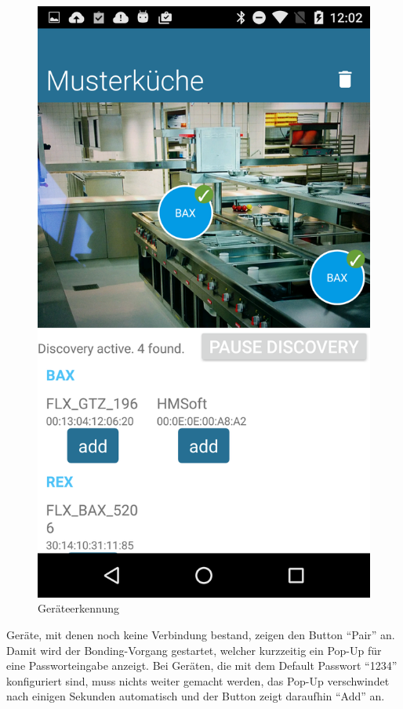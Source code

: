 \begin{figure}
	\vspace{-0.44cm}
	\includegraphics[scale=0.13]{results/res/device_discovery}
	\caption{Geräteerkennung}
\end{figure}

Geräte, mit denen noch keine Verbindung bestand, zeigen den Button \enquote{Pair} an. Damit wird der Bonding-Vorgang gestartet, welcher kurzzeitig ein Pop-Up für eine Passworteingabe anzeigt. Bei Geräten, die mit dem Default Passwort \enquote{1234} konfiguriert sind, muss nichts weiter gemacht werden, das Pop-Up verschwindet nach einigen Sekunden automatisch und der Button zeigt daraufhin \enquote{Add} an.

